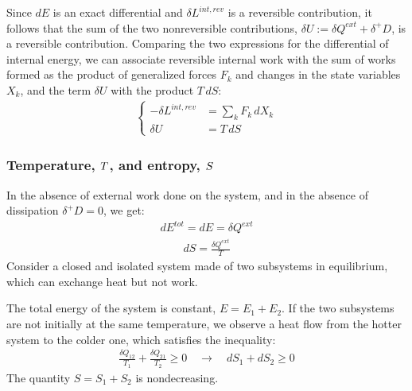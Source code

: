 \documentclass[letterpaper,10pt,english]{jupyterBook}
\begin{document}
\sphinxAtStartPar
Since \( dE \) is an exact differential and \( \delta L^{int,rev} \) is a reversible contribution, it follows that the sum of the two non\sphinxhyphen{}reversible contributions, \( \delta U := \delta Q^{ext} + \delta^+ D \), is a reversible contribution. Comparing the two expressions for the differential of internal energy, we can associate reversible internal work with the sum of works formed as the product of generalized forces \( F_k \) and changes in the state variables \( X_k \), and the term \( \delta U \) with the product \( T \, dS \):
\begin{equation*}
\begin{split}
\begin{cases}
  -\delta L^{int,rev} &= \sum_k F_k \, d X_k \\
  \delta U &= T \, dS
\end{cases}
\end{split}
\end{equation*}\subsubsection*{Temperature, \protect\( T \protect\), and entropy, \protect\( S \protect\)}

\sphinxAtStartPar
In the absence of external work done on the system, and in the absence of dissipation \( \delta^+ D = 0 \), we get:
\begin{equation*}
\begin{split}
dE^{tot} = dE = \delta Q^{ext}
\end{split}
\end{equation*}\begin{equation*}
\begin{split}
dS = \frac{\delta Q^{ext}}{T}
\end{split}
\end{equation*}
\sphinxAtStartPar
Consider a closed and isolated system made of two subsystems in equilibrium, which can exchange heat but not work.

\sphinxAtStartPar
The total energy of the system is constant, \( E = E_1 + E_2 \). If the two subsystems are not initially at the same temperature, we observe a heat flow from the hotter system to the colder one, which satisfies the inequality:
\begin{equation*}
\begin{split}
\frac{\delta Q_{12}}{T_1} + \frac{\delta Q_{21}}{T_2} \ge 0 \quad \rightarrow \quad dS_1 + dS_2 \ge 0
\end{split}
\end{equation*}
\sphinxAtStartPar
The quantity \( S = S_1 + S_2 \) is non\sphinxhyphen{}decreasing.
\end{document}
